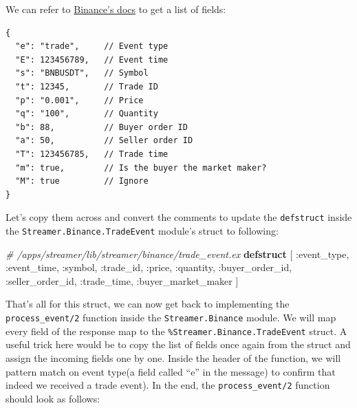 \documentclass[
  oneside]{book}
\newenvironment{Shaded}{\begin{snugshade}}{\end{snugshade}}
\newcommand{\CommentTok}[1]{\textcolor[rgb]{0.56,0.35,0.01}{\textit{#1}}}
\newcommand{\KeywordTok}[1]{\textcolor[rgb]{0.13,0.29,0.53}{\textbf{#1}}}
\newcommand{\NormalTok}[1]{#1}
\newcommand{\VariableTok}[1]{\textcolor[rgb]{0.00,0.00,0.00}{#1}}
\begin{document}
We can refer to \href{https://github.com/binance/binance-spot-api-docs/blob/master/web-socket-streams.md\#trade-streams}{Binance's docs} to get a list of fields:

\begin{verbatim}
{
  "e": "trade",     // Event type
  "E": 123456789,   // Event time
  "s": "BNBUSDT",   // Symbol
  "t": 12345,       // Trade ID
  "p": "0.001",     // Price
  "q": "100",       // Quantity
  "b": 88,          // Buyer order ID
  "a": 50,          // Seller order ID
  "T": 123456785,   // Trade time
  "m": true,        // Is the buyer the market maker?
  "M": true         // Ignore
}
\end{verbatim}

Let's copy them across and convert the comments to update the \texttt{defstruct} inside the
\texttt{Streamer.Binance.TradeEvent} module's struct to following:

\begin{Shaded}
\begin{Highlighting}[]
  \CommentTok{\# /apps/streamer/lib/streamer/binance/trade\_event.ex}
  \KeywordTok{defstruct}\NormalTok{ [}
    \VariableTok{:event\_type}\NormalTok{,}
    \VariableTok{:event\_time}\NormalTok{,}
    \VariableTok{:symbol}\NormalTok{,}
    \VariableTok{:trade\_id}\NormalTok{,}
    \VariableTok{:price}\NormalTok{,}
    \VariableTok{:quantity}\NormalTok{,}
    \VariableTok{:buyer\_order\_id}\NormalTok{,}
    \VariableTok{:seller\_order\_id}\NormalTok{,}
    \VariableTok{:trade\_time}\NormalTok{,}
    \VariableTok{:buyer\_market\_maker}
\NormalTok{  ]}
\end{Highlighting}
\end{Shaded}

That's all for this struct, we can now get back to implementing the \texttt{process\_event/2} function inside the \texttt{Streamer.Binance} module. We will map every field of the response map to the \texttt{\%Streamer.Binance.TradeEvent} struct. A useful trick here would be to copy the list of fields once again from the struct and assign the incoming fields one by one.
Inside the header of the function, we will pattern match on event type(a field called ``e'' in the message) to confirm that indeed we received a trade event). In the end, the \texttt{process\_event/2} function should look as follows:
\end{document}
